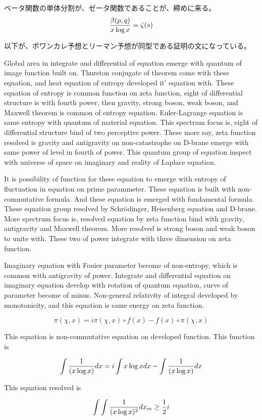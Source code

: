 \documentclass{jsarticle}
\begin{document}
{  ベータ関数の単体分割が、ゼータ関数であることが、締めに来る。
  $$ {\beta(p,q) \over {x\log x}} = \zeta(s) $$

  以下が、ポワンカレ予想とリーマン予想が同型である証明の文になっている。

  Global area in integrate and differential of equation emerge with quantum of image function built on.
Thurston conjugate of theorem come with these equation, and heat equation of entropy developed it' equation with.
These equation of entropy is common function on zeta function, eight of differential structure is with fourth
power, then gravity, strong boson, weak boson, and Maxwell theorem is common of entropy equation.
Euler-Lagrange equation is same entropy with quantum of material equation. This spectrum focus is,
eight of differential structure bind of two perceptive power. These more say, zeta function resolved is gravity
and antigravity on non-catastrophe on D-brane emerge with same power of level in fourth of power. This quantum
group of equation inspect with universe of space on imaginary and reality of Laplace equation.

  It is possibility of function for these equation to emerge with entropy of fluctuation in equation on prime 
parammeter. These equation is built with non-commutative formula. And these equation is emerged with fundamental
formula. These equation group resolved by Schr\"{o}dinger, Heisenberg equation and D-brane.
More spectrum focus is, resolved equation by zeta function bind with gravity, antigravity and Maxwell theorem.
More resolved is strong boson and weak boson to unite with. These two of power integrate with three dimension
on zeta function.

  Imaginary equation with Fouier parameter become of non-entropy, which is common with antigravity of power.
Integrate and differential equation on imaginary equation develop with rotation of quantum equation, curve of
parameter become of minus. Non-general relativity of integral developed by monotonicity, and this equation
is same energy on zeta function.

  $$ \pi(\chi,x) = i \pi (\chi,x) \circ f(x) - f(x) \circ \pi (\chi, x) $$

  This equation is non-commutative equation on developed function. This function is

  $$ \int {1 \over (x \log x)}dx = i \int x \log xdx - \int {1 \over (x \log x)}dx $$

  This equation resolved is

  $$ \int \int {1 \over (x \log x)^2}dx_{m} \ge {1 \over 2}i $$

}
\end{document}
